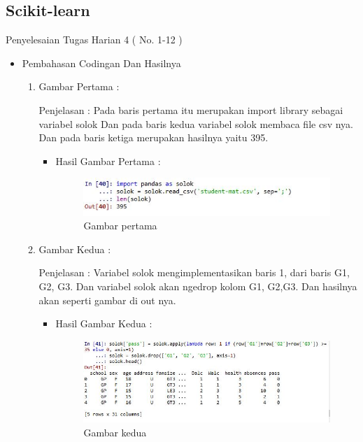 \subsection{Scikit-learn}
Penyelesaian Tugas Harian 4 ( No. 1-12 )
\begin{itemize}
\item Pembahasan Codingan Dan Hasilnya
\begin{enumerate}
\item Gambar Pertama :
\par Penjelasan : Pada baris pertama itu merupakan import library sebagai variabel solok  Dan pada baris kedua variabel solok membaca file csv nya. Dan pada baris ketiga merupakan hasilnya yaitu 395.

\par
\begin{itemize}
\par
\item Hasil  Gambar Pertama :
\par

\begin{figure}[ht]
\centering
\includegraphics[scale=0.6]{figures/1.jpg}
\caption{ Gambar pertama}
\label{1}
\end{figure}

\par
\end{itemize}
\item  Gambar Kedua :
\par Penjelasan : Variabel solok mengimplementasikan baris 1, dari baris G1, G2, G3. Dan variabel solok akan ngedrop kolom G1, G2,G3. Dan hasilnya akan seperti gambar di out nya.
\par 
\begin{itemize}
\par
\item Hasil Gambar Kedua :

\begin{figure}[ht]
\centering
\includegraphics[scale=0.7]{figures/2.jpg}
\caption{Gambar kedua}
\label{2}
\end{figure}


\end{itemize}
\end{enumerate}
\end{itemize}
